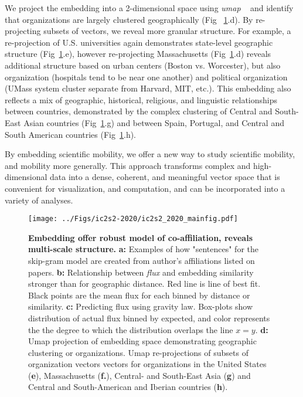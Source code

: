 \documentclass[a4paper,12pt]{article}
\begin{document}
We project the embedding into a 2-dimensional space using \textit{umap} ~\autocite{mcinnes_umap_2018} and identify that organizations are largely clustered geographically (Fig ~\ref{fig:image}.d). 
By re-projecting subsets of vectors, we reveal more granular structure.
For example, a re-projection of U.S. universities again demonstrates state-level geographic structure (Fig~\ref{fig:image}.e), however re-projecting Massachusetts (Fig~\ref{fig:image}.d) reveals additional structure based on urban centers (Boston vs. Worcester), but also organization (hospitals tend to be near one another) and political organization (UMass system cluster separate from Harvard, MIT, etc.).
This embedding also reflects a mix of geographic, historical, religious, and linguistic relationships between countries, demonstrated by the complex clustering of Central and South-East Asian countries (Fig~\ref{fig:image}.g) and between Spain, Portugal, and Central and South American countries (Fig~\ref{fig:image}.h). 

By embedding scientific mobility, we offer a new way to study scientific mobility, and mobility more generally. 
This approach transforms complex and high-dimensional data into a dense, coherent, and meaningful vector space that is convenient for visualization, and computation, and can be incorporated into a variety of analyses. 


\begin{figure}[ht!]
	\centering
	\texttt{[image: ../Figs/ic2s2-2020/ic2s2\_2020\_mainfig.pdf]}
	\caption{ 
	\textbf{Embedding offer robust model of co-affiliation, reveals multi-scale structure.}
	\textbf{a:} Examples of how "sentences" for the skip-gram model are created from author's affiliations listed on papers.
	\textbf{b:} Relationship between \textit{flux} and embedding similarity stronger than for geographic distance. 
	Red line is line of best fit.
	Black points are the mean flux for each binned by distance or similarity. 
	\textbf{c:} Predicting flux using gravity law.
	Box-plots show distribution of actual flux binned by expected, and color represents the the degree to which the distribution overlaps the line $x = y$. 
	\textbf{d:} Umap projection of embedding space demonstrating geographic clustering or organizations.
	Umap re-projections of subsets of organization vectors vectors for organizations in the United States (\textbf{e}), Massachusetts (\textbf{f.}), Central- and South-East Asia (\textbf{g}) and Central and South-American and Iberian countries (\textbf{h}). 
	 }
	\label{fig:image}
\end{figure}

%
%
%
\begingroup
{}
\small
\setlength\bibitemsep{1pt}
\printbibliography
\endgroup
\end{document}
